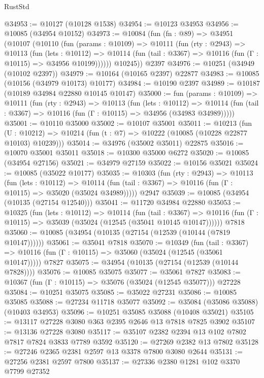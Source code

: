 \begin{lexlean}{RustStd}
\begin{coremodule}
@34953 := @10127 (@10128 @1538)
@34954 := @10123 @34953
@34956 := @10085 (@34954 @10152)
@34973 := @10084
    (fun (fn : @89) =>
    @34951
      (@10107
        (@10110
          (fun (params : @10109) =>
          @10111
            (fun (rty : @2943) =>
            @10113
              (fun (lets : @10112) =>
              @10114 (fun (tail : @3367) => @10116 (fun (Γ : @10115) => @34956 @10199))))))
        @10245))
    @2397
@34976 := @10251 (@34949 (@10102 @2397))
@34979 := @10164 (@10165 @2397) @22877
@34983 := @10085 (@10156 (@34979 @10173) @10177)
@34984 := @10190 @2397
@34989 := @10187 (@10189 @34984 @22880 @10145 @10147)
@35000 := fun (params : @10109) =>
  @10111
    (fun (rty : @2943) =>
    @10113
      (fun (lets : @10112) =>
      @10114 (fun (tail : @3367) => @10116 (fun (Γ : @10115) => @34956 (@34983 @34989)))))
@35001 := @10110 @35000
@35002 := @10107 @35001
@35011 := @10213
    (fun (U : @10212) => @10214 (fun (t : @7) => @10222 (@10085 (@10228 @22877 @10103) @10239)))
@35014 := @34976 (@35002 @35011) @22875
@35016 := @10070 @35001 @35011
@35018 := @10300 @35000 @6272
@35020 := @10085 (@34954 @27156)
@35021 := @34979 @27159
@35022 := @10156 @35021
@35024 := @10085 (@35022 @10177)
@35035 := @10303
    (fun (rty : @2943) =>
    @10113
      (fun (lets : @10112) =>
      @10114 (fun (tail : @3367) => @10116 (fun (Γ : @10115) => @35020 (@35024 @34989)))))
    @2947
@35039 := @10085 (@34954 (@10135 (@27154 @12540)))
@35041 := @11720 @34984 @22880
@35053 := @10325
    (fun (lets : @10112) =>
    @10114
      (fun (tail : @3367) =>
      @10116 (fun (Γ : @10115) => @35039 (@35024 (@12545 (@35041 @10145 @10147))))))
    @7818
@35060 := @10085 (@34954 (@10135 (@27154 (@12539 (@10144 (@7819 @10147))))))
@35061 := @35041 @7818
@35070 := @10349
    (fun (tail : @3367) => @10116 (fun (Γ : @10115) => @35060 (@35024 (@12545 (@35061 @10147)))))
    @7827
@35075 := @34954 (@10135 (@27154 (@12539 (@10144 @7828))))
@35076 := @10085 @35075
@35077 := @35061 @7827
@35083 := @10367 (fun (Γ : @10115) => @35076 (@35024 (@12545 @35077))) @27228
@35084 := @10251 @35075
@35085 := @35022 @27231
@35086 := @10085 @35085
@35088 := @27234 @11718 @35077
@35092 := @35084 (@35086 @35088) (@10403 @34953)
@35096 := @10251 @35085 @35088 (@10408 @35021)
@35105 := @13117 @27228 @3080 @363 @2395 @2646 @13 @7818 @7825 @3902
@35107 := @13136 @27228 @3080
@35117 := @35107 @2382 @2394 @13 @102 @7802 @7817 @7824 @3833 @7789 @3592
@35120 := @27269 @2382 @13 @7802
@35128 := @27246 @2365 @2381 @2597 @13 @3378 @7800 @3080 @2644
@35131 := @27256 @2381 @2597 @7800
@35137 := @27336 @2380 @1281 @102 @3370 @7799 @27352

\end{coremodule}
\end{lexlean}

